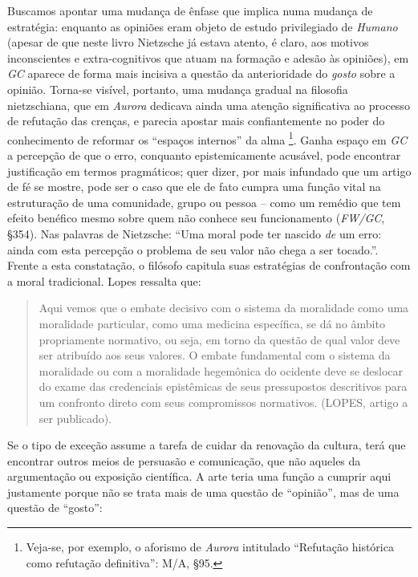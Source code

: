 \documentclass[
	12pt,				%
	openright,			%
	oneside,			%
	a4paper,			%
	english,			%
	french,				%
	spanish,			%
	brazil				%
	]{abntex2}
\begin{document}
	Buscamos apontar uma mudança de ênfase que implica numa mudança de estratégia: enquanto as opiniões eram objeto de estudo privilegiado de \textit{Humano} (apesar de que neste livro Nietzsche já estava atento, é claro, aos motivos inconscientes e extra-cognitivos que atuam na formação e adesão às opiniões), em \textit{GC} aparece de forma mais incisiva a questão da anterioridade do \textit{gosto} sobre a opinião. Torna-se visível, portanto, uma mudança gradual na filosofia nietzschiana, que em \textit{Aurora} dedicava ainda uma atenção significativa ao processo de refutação das crenças, e parecia apostar mais confiantemente no poder do conhecimento de reformar os “espaços internos” da alma
\footnote{Veja-se, por exemplo, o aforismo de \textit{Aurora} intitulado “Refutação histórica como refutação definitiva”: M/A, §95.}. 
Ganha espaço em \textit{GC} a percepção de que o erro, conquanto epistemicamente acusável, pode encontrar justificação em termos pragmáticos; quer dizer, por mais infundado que um artigo de fé se mostre, pode ser o caso que ele de fato cumpra uma função vital na estruturação de uma comunidade, grupo ou pessoa – como um remédio que tem efeito benéfico mesmo sobre quem não conhece seu funcionamento (\textit{FW/GC}, §354). Nas palavras de Nietzsche: “Uma moral pode ter nascido \textit{de} um erro: ainda com esta percepção o problema de seu valor não chega a ser tocado.”. Frente a esta constatação, o filósofo capitula suas estratégias de confrontação com a moral tradicional. Lopes ressalta que: 

\begin{quotation}
Aqui vemos que o embate decisivo com o sistema da moralidade como uma moralidade particular, como uma medicina específica, se dá no âmbito propriamente normativo, ou seja, em torno da questão de qual valor deve ser atribuído aos seus valores. O embate fundamental com o sistema da moralidade ou com a moralidade hegemônica do ocidente deve se deslocar do exame das credenciais epistêmicas de seus pressupostos descritivos para um confronto direto com seus compromissos normativos. (LOPES, artigo a ser publicado).
\end{quotation}

Se o tipo de exceção assume a tarefa de cuidar da renovação da cultura, terá que encontrar outros meios de persuasão e comunicação, que não aqueles da argumentação ou exposição científica. A arte teria uma função a cumprir aqui justamente porque não se trata mais de uma questão de “opinião”, mas de uma questão de “gosto”: 
\end{document}
